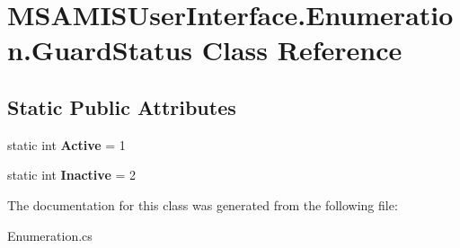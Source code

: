 \hypertarget{class_m_s_a_m_i_s_user_interface_1_1_enumeration_1_1_guard_status}{}\section{M\+S\+A\+M\+I\+S\+User\+Interface.\+Enumeration.\+Guard\+Status Class Reference}
\label{class_m_s_a_m_i_s_user_interface_1_1_enumeration_1_1_guard_status}
\subsection*{Static Public Attributes}
\begin{DoxyCompactItemize}
\item 
\mbox{\label{class_m_s_a_m_i_s_user_interface_1_1_enumeration_1_1_guard_status_a430465d6e75fb66386d408ceaa00fda7}} 
static int {\bfseries Active} = 1
\item 
\mbox{\label{class_m_s_a_m_i_s_user_interface_1_1_enumeration_1_1_guard_status_a5cd9448efdd38730a9d7aa7f5ca3fbca}} 
static int {\bfseries Inactive} = 2
\end{DoxyCompactItemize}


The documentation for this class was generated from the following file\+:\begin{DoxyCompactItemize}
\item 
Enumeration.\+cs\end{DoxyCompactItemize}
